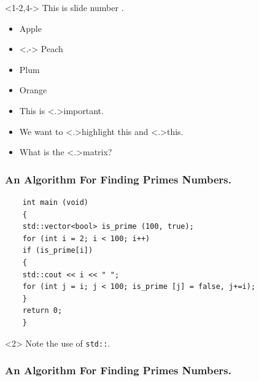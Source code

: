 \begin{frame}<1-2,4->
	This is slide number \only<3>{3}%
	\only<5>{5}.
\end{frame}

\begin{frame}

\begin{itemize}[<+->]
	\item Apple
	\item<.-> Peach
	\item Plum
	\item Orange
\end{itemize}
\end{frame}


\begin{itemize}[<+->]
	\item This is \alert<.>{important}.
	\item We want to \alert<.>{highlight} this and \alert<.>{this}.
	\item What is the \alert<.>{matrix}?
\end{itemize}



\begin{frame}[fragile]
	\frametitle{An Algorithm For Finding Primes Numbers.}
	\begin{verbatim}
	int main (void)
	{
	std::vector<bool> is_prime (100, true);
	for (int i = 2; i < 100; i++)
	if (is_prime[i])
	{
	std::cout << i << " ";
	for (int j = i; j < 100; is_prime [j] = false, j+=i);
	}
	return 0;
	}
	\end{verbatim}
	\begin{uncoverenv}
		Note the use of \verb|std::|.
	\end{uncoverenv}
\end{frame}

\begin{frame}[fragile]
	\frametitle{An Algorithm For Finding Primes Numbers.}
	\begin{semiverbatim}
	\end{semiverbatim}
\end{frame}



